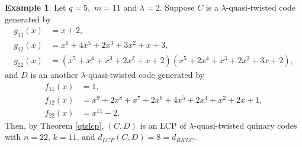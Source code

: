 \documentclass[12 pt]{extarticle}
\numberwithin{equation}{section}
\theoremstyle{definition}
\newtheorem{example}{Example}[section]
\begin{document}
\begin{example}
    Let $q=5,$ $m=11$ and $\lambda=2$. Suppose $C$ is a $\lambda$-quasi-twisted code generated by 
     \begin{equation*}
     \begin{split}
       g_{11}(x)&=x+2,\\ 
       g_{12}(x)&=x^6 + 4x^5 + 2x^3 + 3x^2 + x + 3,\\
     g_{22}(x)&=(x^5 + x^4 + x^3 + 2x^2 + x + 2)(x^5 + 2x^4 + x^3 + 2x^2 + 3x + 2),
     \end{split}
 \end{equation*}
  and $D$ is an another $\lambda$-quasi-twisted code generated by 
  \begin{equation*}
     \begin{split}
       f_{11}(x)&=1,\\ 
       f_{12}(x)&=x^9 + 2x^8 + x^7 + 2x^6 + 4x^5 + 2x^4 + x^2 + 2x + 1,\\
       f_{22}(x)&=x^{11}-2.
     \end{split}
 \end{equation*}
 Then, by Theorem \ref{qtslcp}, $(C,D)$ is an LCP of $\lambda$-quasi-twisted quinary codes with $n=22$, $k=11$, and $d_{LCP}(C,D)=8=d_{BKLC}$. 
\end{example}

\end{document}
